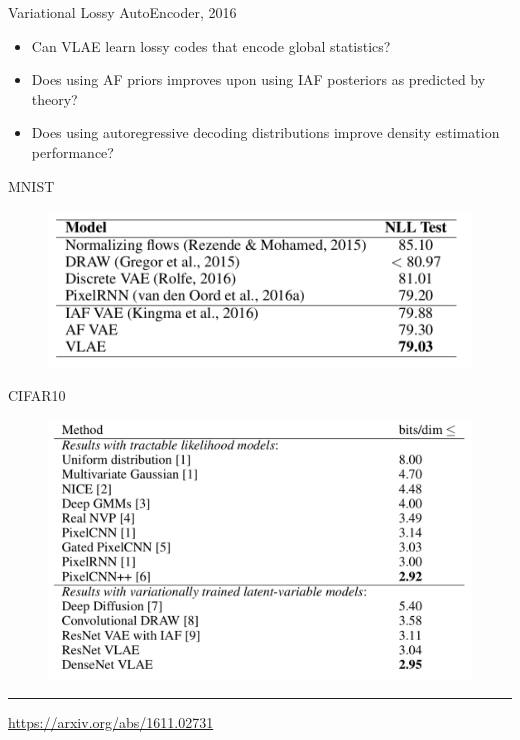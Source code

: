 \documentclass{beamer}
\begin{document}
\begin{frame}{Variational Lossy AutoEncoder, 2016}
\begin{itemize}
    \item Can VLAE learn lossy codes that encode global statistics?
    \item Does using AF priors improves upon using IAF posteriors as predicted by theory?
    \item Does using autoregressive decoding distributions improve density estimation performance?
\end{itemize}
	\begin{minipage}[t]{0.5\columnwidth}
	\vspace{1cm}
		MNIST
		\begin{figure}[h]
			\centering
			\includegraphics[width=1.\linewidth]{figs/VLAE_1.png}
		\end{figure}
	\end{minipage}%
	\begin{minipage}[t]{0.5\columnwidth}
		CIFAR10
		\begin{figure}[h]
			\centering
			\includegraphics[width=1.\linewidth]{figs/VLAE_2.png}
		\end{figure}
	\end{minipage}
\vfill
\hrule\medskip
{\scriptsize \href{https://arxiv.org/abs/1611.02731}{https://arxiv.org/abs/1611.02731}}
\end{frame}
\end{document}
